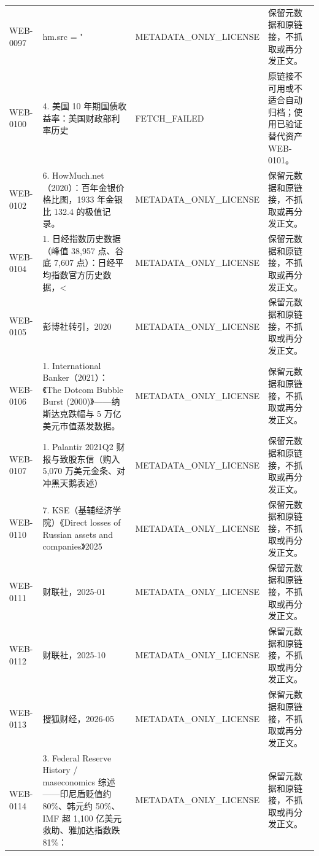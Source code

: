 \documentclass[UTF8,openany,oneside,11pt]{ctexbook}
\begin{document}
\begin{longtable}{L{1.5cm}L{5.5cm}L{3cm}L{5cm}}
WEB-\allowbreak{}0097 & hm.src = " & METADATA\_\allowbreak{}ONLY\_\allowbreak{}LICENSE & 保留元数据和原链接，不抓取或再分发正文。 \\
WEB-\allowbreak{}0100 & 4. 美国 10 年期国债收益率：美国财政部利率历史 & FETCH\_\allowbreak{}FAILED & 原链接不可用或不适合自动归档；使用已验证替代资产 WEB-\allowbreak{}0101。 \\
WEB-\allowbreak{}0102 & 6. HowMuch.net（2020）：百年金银价格比图，1933 年金银比 132.4 的极值记录。 & METADATA\_\allowbreak{}ONLY\_\allowbreak{}LICENSE & 保留元数据和原链接，不抓取或再分发正文。 \\
WEB-\allowbreak{}0104 & 1. 日经指数历史数据（峰值 38,\allowbreak{}957 点、谷底 7,\allowbreak{}607 点）：日经平均指数官方历史数据，< & METADATA\_\allowbreak{}ONLY\_\allowbreak{}LICENSE & 保留元数据和原链接，不抓取或再分发正文。 \\
WEB-\allowbreak{}0105 & 彭博社转引，2020 & METADATA\_\allowbreak{}ONLY\_\allowbreak{}LICENSE & 保留元数据和原链接，不抓取或再分发正文。 \\
WEB-\allowbreak{}0106 & 1. International Banker（2021）：《The Dotcom Bubble Burst (2000)》——纳斯达克跌幅与 5 万亿美元市值蒸发数据。 & METADATA\_\allowbreak{}ONLY\_\allowbreak{}LICENSE & 保留元数据和原链接，不抓取或再分发正文。 \\
WEB-\allowbreak{}0107 & 1. Palantir 2021Q2 财报与致股东信（购入 5,\allowbreak{}070 万美元金条、对冲黑天鹅表述） & METADATA\_\allowbreak{}ONLY\_\allowbreak{}LICENSE & 保留元数据和原链接，不抓取或再分发正文。 \\
WEB-\allowbreak{}0110 & 7. KSE（基辅经济学院）《Direct losses of Russian assets and companies》2025 & METADATA\_\allowbreak{}ONLY\_\allowbreak{}LICENSE & 保留元数据和原链接，不抓取或再分发正文。 \\
WEB-\allowbreak{}0111 & 财联社，2025-\allowbreak{}01 & METADATA\_\allowbreak{}ONLY\_\allowbreak{}LICENSE & 保留元数据和原链接，不抓取或再分发正文。 \\
WEB-\allowbreak{}0112 & 财联社，2025-\allowbreak{}10 & METADATA\_\allowbreak{}ONLY\_\allowbreak{}LICENSE & 保留元数据和原链接，不抓取或再分发正文。 \\
WEB-\allowbreak{}0113 & 搜狐财经，2026-\allowbreak{}05 & METADATA\_\allowbreak{}ONLY\_\allowbreak{}LICENSE & 保留元数据和原链接，不抓取或再分发正文。 \\
WEB-\allowbreak{}0114 & 3. Federal Reserve History /\allowbreak{} maseconomics 综述——印尼盾贬值约 80\%、韩元约 50\%、IMF 超 1,\allowbreak{}100 亿美元救助、雅加达指数跌 81\%： & METADATA\_\allowbreak{}ONLY\_\allowbreak{}LICENSE & 保留元数据和原链接，不抓取或再分发正文。 \\

\end{longtable}
\end{document}
